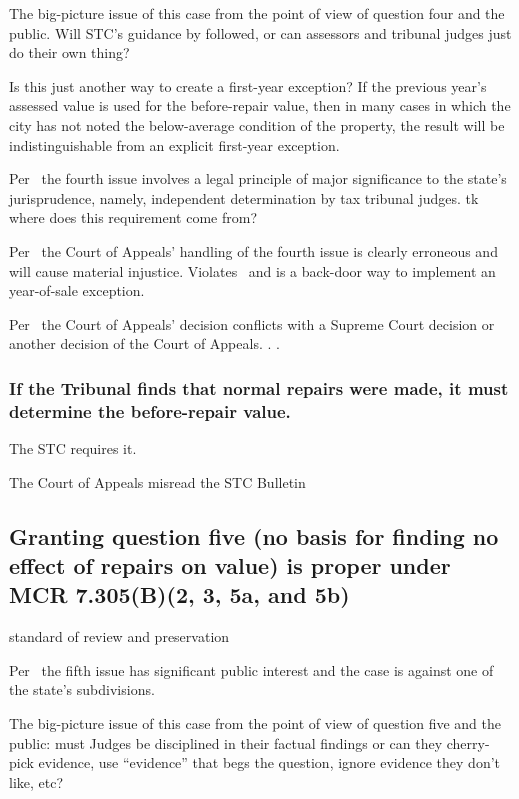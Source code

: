 \documentclass[12pt,\documentclassflag]{michiganCourtOfAppealsBrief}
\begin{document}
The big-picture issue of this case from the point of view of question four and the public. Will STC's guidance by followed, or can assessors and tribunal judges just do their own thing?

Is this just another way to create a first-year exception? If the previous year's assessed value is used for the before-repair value, then in many cases in which the city has not noted the below-average condition of the property, the result will be indistinguishable from an explicit first-year exception. 

Per \cite{MCR 7.305(B)(3)}\ the fourth issue involves a legal principle of major significance to the state's jurisprudence, namely, independent determination by tax tribunal judges. tk where does this requirement come from?

Per \cite{MCR 7.305(B)(5a)}\ the Court of Appeals' handling of the fourth  issue is clearly erroneous and will cause material injustice. Violates \cite{Jones & Laughlin}\ and is a back-door way to implement an year-of-sale exception.

Per \cite{MCR 7.305(B)(5b)}\ the Court of Appeals' decision conflicts with a Supreme Court decision or another decision of the Court of Appeals. \cite{Jones & Laughlin}. \cite{Jones & Laughlin}.

\subsubsection{If the Tribunal finds that normal repairs were made, it must determine the before-repair value.}

The STC requires it.

The Court of Appeals misread the STC Bulletin


\subsection{Granting question five (no basis for finding no effect of repairs on value) is proper under MCR 7.305(B)(2, 3, 5a, and 5b)}

standard of review and preservation

Per \cite{MCR 7.305(B)(2)}\ the fifth issue has significant public interest and the case is against one of the state's subdivisions.

The big-picture issue of this case from the point of view of question five and the public: must Judges be disciplined in their factual findings or can they cherry-pick evidence, use ``evidence'' that begs the question, ignore evidence they don't like, etc?
\end{document}
